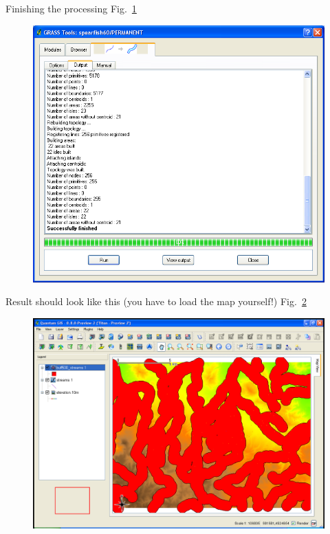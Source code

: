Finishing the processing Fig.~\ref{fig:qgis036}

\begin{figure}[htbp]
   \centering
   \includegraphics[scale=0.3]{qgis036.png}
   \caption{}
   \label{fig:qgis036}
\end{figure}

Result should look like this (you have to load the map yourself!) Fig.~\ref{fig:qgis037}

\begin{figure}[htbp]
   \centering
   \includegraphics[scale=0.2]{qgis037.png}
   \caption{}
   \label{fig:qgis037}
\end{figure}

